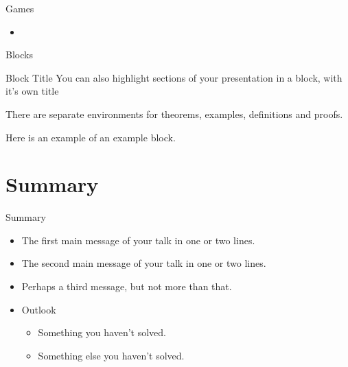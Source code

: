 \documentclass{beamer}
\begin{document}
\begin{frame}{Games}
	\begin{itemize}
		\setlength\itemsep{1em}
		\item 
	\end{itemize}
\end{frame}



\begin{frame}{Blocks}
\begin{block}{Block Title}
You can also highlight sections of your presentation in a block, with it's own title
\end{block}
\begin{theorem}
There are separate environments for theorems, examples, definitions and proofs.
\end{theorem}
\begin{example}
Here is an example of an example block.
\end{example}
\end{frame}

\section*{Summary}

\begin{frame}{Summary}
  \begin{itemize}
  \item
    The \alert{first main message} of your talk in one or two lines.
  \item
    The \alert{second main message} of your talk in one or two lines.
  \item
    Perhaps a \alert{third message}, but not more than that.
  \end{itemize}
  
  \begin{itemize}
  \item
    Outlook
    \begin{itemize}
    \item
      Something you haven't solved.
    \item
      Something else you haven't solved.
    \end{itemize}
  \end{itemize}
\end{frame}
\end{document}
